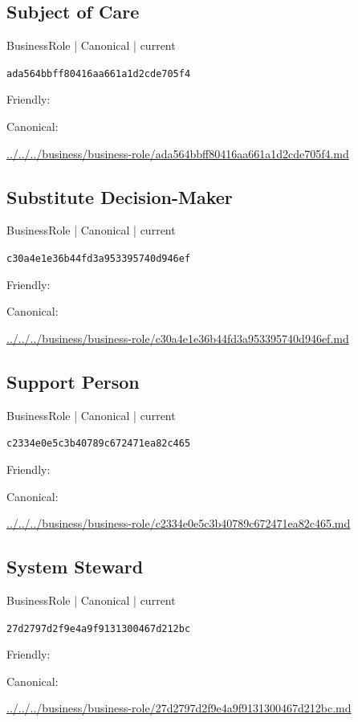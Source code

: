 \documentclass[10pt,a4paper]{article}
\begin{document}
\subsection*{Subject of Care}
{\small BusinessRole | Canonical | current}\par
\texttt{ada564bbff80416aa661a1d2cde705f4}\par
Friendly: \par
Canonical: \par
{\footnotesize\url{../../../business/business-role/ada564bbff80416aa661a1d2cde705f4.md}}\par
\subsection*{Substitute Decision-Maker}
{\small BusinessRole | Canonical | current}\par
\texttt{c30a4e1e36b44fd3a953395740d946ef}\par
Friendly: \par
Canonical: \par
{\footnotesize\url{../../../business/business-role/c30a4e1e36b44fd3a953395740d946ef.md}}\par
\subsection*{Support Person}
{\small BusinessRole | Canonical | current}\par
\texttt{c2334e0e5c3b40789c672471ea82c465}\par
Friendly: \par
Canonical: \par
{\footnotesize\url{../../../business/business-role/c2334e0e5c3b40789c672471ea82c465.md}}\par
\subsection*{System Steward}
{\small BusinessRole | Canonical | current}\par
\texttt{27d2797d2f9e4a9f9131300467d212bc}\par
Friendly: \par
Canonical: \par
{\footnotesize\url{../../../business/business-role/27d2797d2f9e4a9f9131300467d212bc.md}}\par
\end{document}
